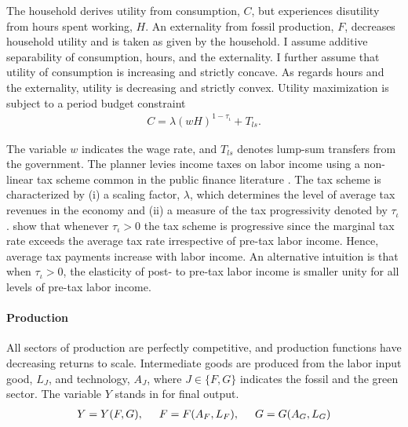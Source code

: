 The household derives utility from consumption, $C$, but experiences disutility from hours spent working, $H$. An externality from fossil production, $F$, decreases household utility and is taken as given by the household.
I assume additive separability of consumption, hours, and the externality. I further assume that utility of consumption is increasing and strictly concave. As regards hours and the externality, utility is decreasing and strictly convex.
Utility maximization is subject to a period budget constraint
\begin{align}
	 C= \lambda(wH)^{1-\tau_{\iota}}+T_{ls}. \label{eq:hhbudget}
\end{align}

The variable $w$ indicates the wage rate, and $T_{ls}$ denotes lump-sum transfers from the government.
The planner levies income taxes on labor income using a non-linear tax scheme common in the public finance literature \citep{Heathcote2017OptimalFramework, Benabou2002TaxEfficiency}. The tax scheme is
characterized by (i) a scaling factor, $\lambda$, which determines the level of average tax revenues in the economy and (ii) a measure of the tax progressivity denoted by $\tau_{\iota}$. 
\cite{Heathcote2017OptimalFramework} show that whenever $\tau_{\iota}>0$ the tax scheme is progressive since the marginal tax rate exceeds the average tax rate irrespective of  pre-tax labor income. Hence, average tax payments increase with labor income. An alternative intuition is that when $\tau_{\iota}>0$, the elasticity of post- to pre-tax labor income is smaller unity for all levels of pre-tax labor income.  %

\paragraph{Production}
All sectors of production are perfectly competitive, and production functions have decreasing returns to scale. %
Intermediate goods are produced from the labor input good, $L_J$, and technology, $A_J$, where $J\in \{F,G\}$ indicates the fossil and the green sector. The variable $Y$ stands in for final output.  
\begin{align}
Y=Y(F, G), \hspace{5mm} F=F(A_F, L_F),\hspace{5mm} G=G(A_G, L_G) \label{eq:prod}
\end{align}

